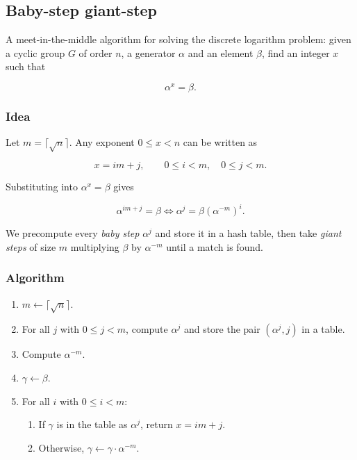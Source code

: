 \subsection{Baby-step giant-step}

A meet-in-the-middle algorithm for solving the discrete logarithm problem: given a
cyclic group $G$ of order $n$, a generator $\alpha$ and an element $\beta$, find an
integer $x$ such that

\begin{equation}
    \alpha^{x} = \beta.
\end{equation}

\subsubsection{Idea}

Let $m = \lceil \sqrt{n} \rceil$. Any exponent $0 \leq x < n$ can be written as

\begin{equation}
    x = im + j, \qquad 0 \leq i < m, \quad 0 \leq j < m.
\end{equation}

Substituting into $\alpha^{x} = \beta$ gives

\begin{equation}
    \alpha^{im + j} = \beta \iff \alpha^{j} = \beta \left( \alpha^{-m} \right)^{i}.
\end{equation}

We precompute every \emph{baby step} $\alpha^{j}$ and store it in a hash table, then
take \emph{giant steps} of size $m$ multiplying $\beta$ by $\alpha^{-m}$ until a match
is found.

\subsubsection{Algorithm}

\begin{enumerate}
  \item $m \gets \lceil \sqrt{n} \rceil$.
  \item For all $j$ with $0 \leq j < m$, compute $\alpha^{j}$ and store the pair
        $(\alpha^{j}, j)$ in a table.
  \item Compute $\alpha^{-m}$.
  \item $\gamma \gets \beta$.
  \item For all $i$ with $0 \leq i < m$:
    \begin{enumerate}
      \item If $\gamma$ is in the table as $\alpha^{j}$, return $x = im + j$.
      \item Otherwise, $\gamma \gets \gamma \cdot \alpha^{-m}$.
    \end{enumerate}
\end{enumerate}

